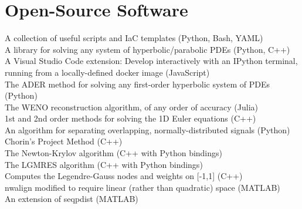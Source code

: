 \documentclass[a4paper]{custom-resume}
\begin{document}
\begin{minipage}[t][0.8\textheight]{0.66\textwidth}


\section{Open-Source Software}

\begin{flushleft}
A collection of useful scripts and IaC templates (Python, Bash, YAML) \\
\vspace{4pt}
A library for solving any system of hyperbolic/parabolic PDEs (Python, C++) \\
\vspace{4pt}
A Visual Studio Code extension: Develop interactively with an IPython terminal, running from a locally-defined docker image (JavaScript)\\
\vspace{4pt}
The ADER method for solving any first-order hyperbolic system of PDEs (Python) \\
\vspace{4pt}
The WENO reconstruction algorithm, of any order of accuracy (Julia) \\
\vspace{4pt}
1st and 2nd order methods for solving the 1D Euler equations (C++) \\
\vspace{4pt}
An algorithm for separating overlapping, normally-distributed signals (Python) \\
\vspace{4pt}
Chorin's Project Method (C++) \\
\vspace{4pt}
The Newton-Krylov algorithm (C++ with Python bindings) \\
\vspace{4pt}
The LGMRES algorithm (C++ with Python bindings) \\
\vspace{4pt}
Computes the Legendre-Gauss nodes and weights on [-1,1] (C++) \\
\vspace{4pt}
nwalign modified to require linear (rather than quadratic) space (MATLAB) \\
\vspace{4pt}
An extension of seqpdist (MATLAB)
\end{flushleft}


\end{minipage}
\end{document}

